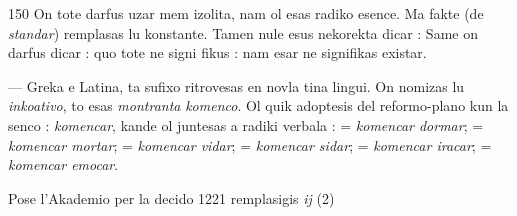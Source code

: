 \begin{VUpage}[154]{150}
On tote darfus uzar  mem izolita, nam ol esas radiko\nl
esence. Ma fakte  (de \textit{standar}) remplasas lu konstante.\nl
Tamen nule esus nekorekta dicar : \nl
Same on darfus dicar :  quo tote ne signi\cc
fikus :  nam esar ne signifikas existar.

 --- Greka e Latina, ta sufixo ritrovesas en novla\cc
tina lingui. On nomizas lu \textit{inkoativo}, to esas \textit{montranta}\nl
\textit{komenco}. Ol quik adoptesis del reformo-plano kun la senco :\nl
\textit{komencar}, kande ol juntesas a radiki verbala :  =\nl
\textit{komencar dormar};  = \textit{komencar mortar}; \nl
= \textit{komencar vidar};  = \textit{komencar sidar};  =\nl
\textit{komencar iracar};  = \textit{komencar emocar}.

Pose l'Akademio per la decido 1221 remplasigis \textit{ij} (2)
\end{VUpage}

